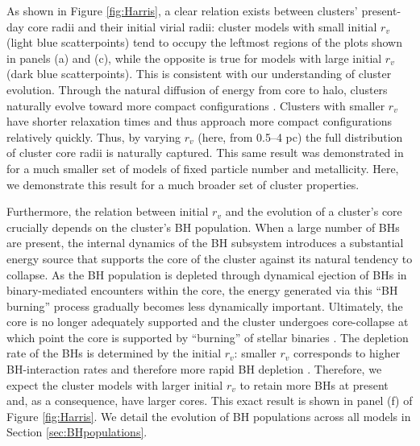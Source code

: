 \documentclass[twocolumn,tighten]{aastex63}
\begin{document}
As shown in Figure \ref{fig:Harris}, a clear relation exists between clusters' present-day core radii and their initial virial radii: cluster models with small initial $r_v$ (light blue scatterpoints) tend to occupy the leftmost regions of the plots shown in panels (a) and (c), while the opposite is true for models with large initial $r_v$ (dark blue scatterpoints). This is consistent with our understanding of cluster evolution. Through the natural diffusion of energy from core to halo, clusters naturally evolve toward more compact configurations \citep[$r_c$ decreases over time; see e.g.,][for an overview]{HeggieHut2003}. Clusters with smaller $r_v$ have shorter relaxation times and thus approach more compact configurations relatively quickly. Thus, by varying $r_v$ (here, from 0.5--4 pc) the full distribution of cluster core radii is naturally captured. This same result was demonstrated in \citet{Kremer2019a} for a much smaller set of models of fixed particle number and metallicity. Here, we demonstrate this result for a much broader set of cluster properties.

Furthermore, the relation between initial $r_v$ and the evolution of a cluster's core crucially depends on the cluster's BH population.
When a large number of BHs are present, the internal dynamics of the BH subsystem introduces a substantial energy source that supports the core of the cluster against its natural tendency to collapse. As the BH population is depleted through dynamical ejection of BHs in binary-mediated encounters within the core, the energy generated via this ``BH burning'' process gradually becomes less dynamically important. Ultimately, the core is no longer adequately supported and the cluster undergoes core-collapse at which point the core is supported by ``burning'' of stellar binaries \citep{Chatterjee2013a}. The depletion rate of the BHs is determined by the initial $r_v$: smaller $r_v$ corresponds to higher BH-interaction rates and therefore more rapid BH depletion \citep{Kremer2019a}. Therefore, we expect the cluster models with larger initial $r_v$ to retain more BHs at present and, as a consequence, have larger cores. This exact result is shown in panel (f) of Figure \ref{fig:Harris}. We detail the evolution of BH populations across all models in Section \ref{sec:BHpopulations}.
\end{document}
